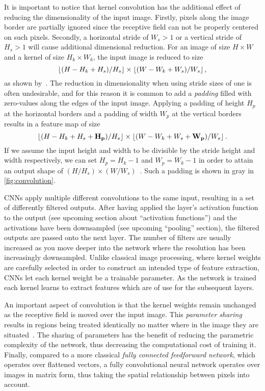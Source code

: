 It is important to notice that kernel convolution has the additional effect of reducing the dimensionality of the input image.
Firstly, pixels along the image border are partially ignored since the receptive field can not be properly centered on such pixels.
Secondly, a horizontal stride of $W_s > 1$ or a vertical stride of $H_s > 1$ will cause additional dimensional reduction.
For an image of size $H \times W$ and a kernel of size $H_k \times W_k$, the input image is reduced to size
%
\begin{equation*}
  \left\lfloor (H - H_k + H_s) / H_s \right\rfloor
  \times
  \left\lfloor (W - W_k + W_s) / W_s \right\rfloor,
\end{equation*}
%
as shown by~\cite{dive-into-deep-learning}.
The reduction in dimensionality when using stride sizes of one is often undesirable, and for this reason it is common to add a \textit{padding} filled with zero-values along the edges of the input image.
Applying a padding of height $H_p$ at the horizontal borders and a padding of width $W_p$ at the vertical borders results in a feature map of size
%
\begin{equation*}
  \left\lfloor (H - H_k + H_s + \mathbf{H_p}) / H_s \right\rfloor
  \times
  \left\lfloor (W - W_k + W_s + \mathbf{W_p}) / W_s \right\rfloor.
\end{equation*}
%
If we assume the input height and width to be divisible by the stride height and width respectively, we can set $H_p = H_k - 1$ and $W_p = W_k - 1$ in order to attain an output shape of $(H / H_s) \times (W / W_s)$~\cite{dive-into-deep-learning}.
Such a padding is shown in gray in \cref{fig:convolution}.

CNNs apply multiple different convolutions to the same input, resulting in a set of differently filtered outputs.
After having applied the layer's activation function to the output (see upcoming section about \enquote{activation functions}) and the activations have been downsampled (see upcoming \enquote{pooling} section), the filtered outputs are passed onto the next layer.
The number of filters are usually increased as you move deeper into the network where the resolution has been increasingly downsampled.
Unlike classical image processing, where kernel weights are carefully selected in order to construct an intended type of feature extraction, CNNs let each kernel weight be a trainable parameter.
As the network is trained each kernel learns to extract features which are of use for the subsequent layers.

An important aspect of convolution is that the kernel weights remain unchanged as the receptive field is moved over the input image.
This \textit{parameter sharing} results in regions being treated identically no matter where in the image they are situated~\cite{visint-cnn}.
The sharing of parameters has the benefit of reducing the parametric complexity of the network, thus decreasing the computational cost of training it.
Finally, compared to a more classical \textit{fully connected feedforward network}, which operates over flattened vectors, a fully convolutional neural network operates over images in matrix form, thus taking the spatial relationship between pixels into account.
